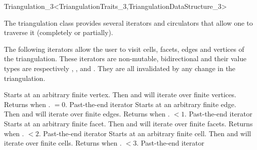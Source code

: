 \begin{ccRefClass}{Triangulation_3<TriangulationTraits_3,TriangulationDataStructure_3>}

The triangulation class provides several iterators and circulators
that allow one to traverse it (completely or partially).


The following iterators allow the user to visit cells,
facets, edges and vertices of the
triangulation. These iterators are non-mutable, bidirectional and
their value types are respectively , , 
and . They are all invalidated by any change in the
triangulation. 

{Starts at an arbitrary finite vertex. Then \ccc{++} and \ccc{--} will
iterate over finite vertices. Returns  when
\ccVar. $=0$.} 
\ccGlue
{}
{Past-the-end iterator}
\ccGlue
{}
{Starts at an arbitrary finite edge. Then \ccc{++} and \ccc{--} will
iterate over finite edges. Returns  when
\ccVar. $<1$.} 
\ccGlue
{}
{Past-the-end iterator}
\ccGlue
{}
{Starts at an arbitrary finite facet. Then \ccc{++} and \ccc{--} will
iterate over finite facets. Returns  when
\ccVar. $<2$.}
\ccGlue
{}
{Past-the-end iterator}
\ccGlue
{}
{Starts at an arbitrary finite cell. Then \ccc{++} and \ccc{--} will
iterate over finite cells. Returns  when
\ccVar. $<3$.}
\ccGlue
{}
{Past-the-end iterator}


\end{ccRefClass}
